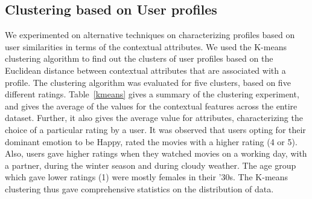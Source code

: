 \documentclass{article}
\begin{document}

\subsection{Clustering based on User profiles}
 We experimented on alternative techniques on characterizing profiles based on user similarities in terms of the contextual attributes. We used the K-means clustering algorithm to find out the clusters of user profiles based on the Euclidean distance between contextual attributes that are associated with a profile. The clustering algorithm was evaluated for five clusters, based on five different ratings. Table~\ref{kmeans} gives a summary of the clustering experiment, and gives the average of the values for the contextual features across the entire dataset. Further, it also gives the average value for attributes, characterizing the choice of a particular rating by a user. It was observed that users opting for their dominant emotion to be Happy, rated the movies with a higher rating (4 or 5). Also, users gave higher ratings when they watched movies on a working day, with a partner, during the winter season and during cloudy weather. The age group which gave lower ratings (1) were mostly females in their '30s. The K-means clustering thus gave comprehensive statistics on the distribution of data.
\end{document}
